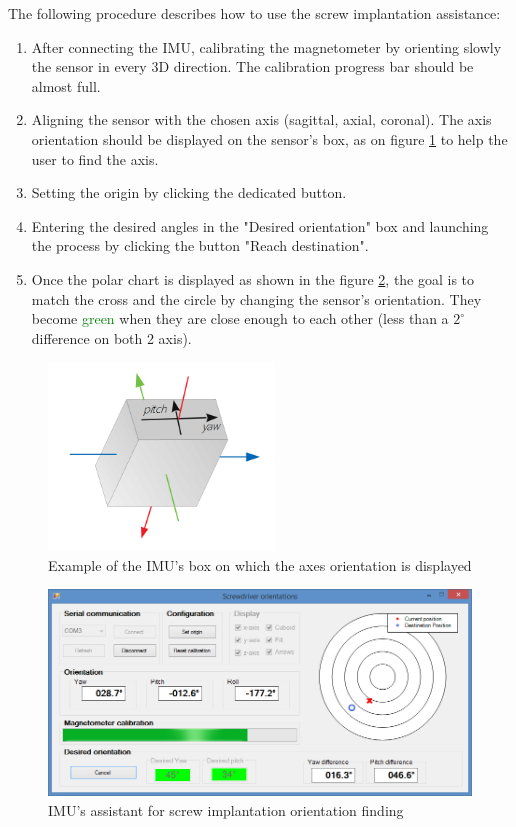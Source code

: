 \documentclass{article}
\begin{document}
The following procedure describes how to use the screw implantation assistance:
\begin{enumerate}
    \item After connecting the IMU, calibrating the magnetometer by orienting slowly the sensor in every 3D direction. The calibration progress bar should be almost full.
    \item Aligning the sensor with the chosen axis (sagittal, axial, coronal). The axis orientation should be displayed on the sensor's box, as on figure \ref{fig:3D_axis_displ} to help the user to find the axis. 
    \item Setting the origin by clicking the dedicated button.
    \item Entering the desired angles in the "Desired orientation" box and launching the process by clicking the button "Reach destination".
    \item Once the polar chart is displayed as shown in the figure \ref{fig:polar_chart}, the goal is to match the cross and the circle by changing the sensor's orientation. They become \textcolor{green}{green} when they are close enough to each other (less than a $2^\circ$ difference on both 2 axis). 
\end{enumerate}

\begin{figure}[H]
    \centering
    \includegraphics[height = 5cm]{images/3D_example_user_help.png}
    \caption{Example of the IMU's box on which the axes orientation is displayed}
    \label{fig:3D_axis_displ}
\end{figure}

\begin{figure}[H]
    \centering
    \includegraphics[width=\textwidth]{images/polar_chart.png}
    \caption{IMU's assistant for screw implantation orientation finding}
    \label{fig:polar_chart}
\end{figure}
\end{document}
